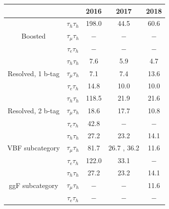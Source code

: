 \documentclass[../main.tex]{subfiles}
\begin{document}
\begin{table}[!h]
  \begin{center}
    \begin{tabular}{c | c | c | c | c}
                                        &                  & 2016         & 2017         & 2018         \\\hline
                                        & $\tau_h\tau_h$   & 198.0        & 44.5         & 60.6         \\
    Boosted                             & $\tau_\mu\tau_h$ & $-$          & $-$          & $-$          \\
                                        & $\tau_e\tau_h$   & $-$          & $-$          & $-$          \\
    \hline
                                        & $\tau_h\tau_h$   & 7.6          & 5.9          & 4.7          \\
    Resolved, 1 b-tag                        & $\tau_\mu\tau_h$ & 7.1          & 7.4          & 13.6         \\
                                        & $\tau_e\tau_h$   & 14.8         & 10.0         & 10.0         \\
    \hline
                                        & $\tau_h\tau_h$   & 118.5        & 21.9         & 21.6         \\
    Resolved, 2 b-tag                       & $\tau_\mu\tau_h$ & 18.6         & 17.7         & 10.8         \\
                                        & $\tau_e\tau_h$   & 42.8         & $-$          & $-$          \\
    \hline
                                        & $\tau_h\tau_h$   & 27.2         & 23.2         & 14.1         \\
    VBF subcategory         & $\tau_\mu\tau_h$ & 81.7         & 26.7 , 36.2  & 11.6         \\
                                        & $\tau_e\tau_h$   & 122.0        & 33.1         & $-$          \\
    \hline
                                        & $\tau_h\tau_h$   & 27.2         & 23.2         & 14.1         \\
    ggF subcategory                     & $\tau_\mu\tau_h$ & $-$          & $-$          & 11.6         \\
                                        & $\tau_e\tau_h$   & $-$          & $-$          & $-$          \\
    \hline

\end{tabular}
\end{center}
\end{table}
\end{document}
